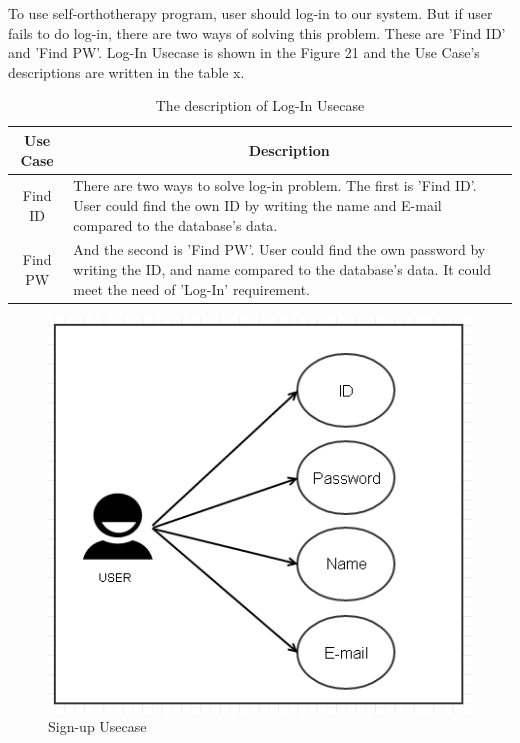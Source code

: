 \documentclass[conference]{IEEEtran}
\begin{document}
To use self-orthotherapy program, user should log-in to our system. But if user fails to do log-in, there are two ways of solving this problem. These are 'Find ID' and 'Find PW'. Log-In Usecase is shown in the Figure 21 and the Use Case's descriptions are written in the table x.  




\begin{table}[h]
{\renewcommand\arraystretch{1.25}
\caption{The description of Log-In Usecase}
\begin{tabular}{|c|l|l|} \hline
Use Case & \multicolumn{2}{c|}{Description} \\ \hline\hline
Find ID& \multicolumn{2}{p{6.75cm}|}{\raggedright There are two ways to solve log-in problem. The first is 'Find ID'. User could find the own ID by writing the name and E-mail compared to the database's data.} \\ \hline
Find PW& \multicolumn{2}{p{6.75cm}|}{\raggedright And the second is 'Find PW'. User could find the own password by writing the ID, and name compared to the database's data. It could meet the need of 'Log-In' requirement.} \\ \hline
\end{tabular}}
\end{table}


\begin{figure}[H]
\begin{center}
    \includegraphics[scale=0.7]{img_19.png}
    \caption{Sign-up Usecase} 
\end{center}
\end{figure}
 		  
\end{document}
